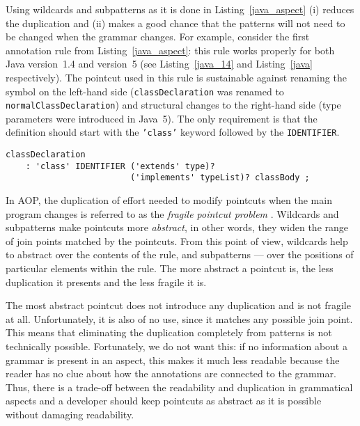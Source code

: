 \documentclass{IOS-Book-Article}     %
\newcommand{\bad}[1]{\textcolor{red}{#1}}
\renewcommand{\bad}[1]{#1}
\newcommand{\lstref}[1]{Listing~\ref{#1}}
\begin{document}
Using wildcards and subpatterns as it is done in \lstref{java_aspect} (i) reduces the duplication and (ii) makes a good chance that the patterns will not need to be changed when the grammar changes. For example, consider the first annotation rule from \lstref{java_aspect}: this rule works properly for both Java version~1.4 and version~5 (see \lstref{java_14} and \lstref{java} respectively). The pointcut used in this rule is sustainable against renaming the symbol on the left-hand side (\texttt{classDeclaration} was renamed to \texttt{normalClassDeclaration}) and structural changes to the right-hand side (type parameters were introduced in Java~5). The only requirement is that the definition should start with the \texttt{'class'} keyword followed by the \texttt{IDENTIFIER}.

\begin{lstlisting}[language=Grammatic,caption=Class declaration rule in Java 1.4,label=java_14,float]
classDeclaration
	: 'class' IDENTIFIER ('extends' type)? 
                         ('implements' typeList)? classBody ;
\end{lstlisting}

In AOP, the duplication of effort needed to modify pointcuts when the main program changes is referred to as the \emph{fragile pointcut problem} \cite{Fragile}. Wildcards and subpatterns make pointcuts more \emph{abstract}, in other words, they widen the range of join points matched by the pointcuts. From this point of view, wildcards help to abstract over the contents of the rule, and subpatterns --- over the positions of particular elements within the rule. The more abstract a pointcut is, the less duplication it presents and the less fragile it is. 

The most abstract pointcut does not introduce any duplication and is not fragile at all. Unfortunately, it is also of no use, since it matches any possible join point. This means that eliminating the duplication completely from patterns is not technically possible. Fortunately, we do not want this: if no information about a grammar is present in an aspect, this makes it much less readable because the reader has no clue about how the annotations are connected to the grammar. Thus, there is a trade-off between the readability and duplication in grammatical aspects and a developer should keep pointcuts as abstract as it is possible without \bad{damaging} readability.
\end{document}
